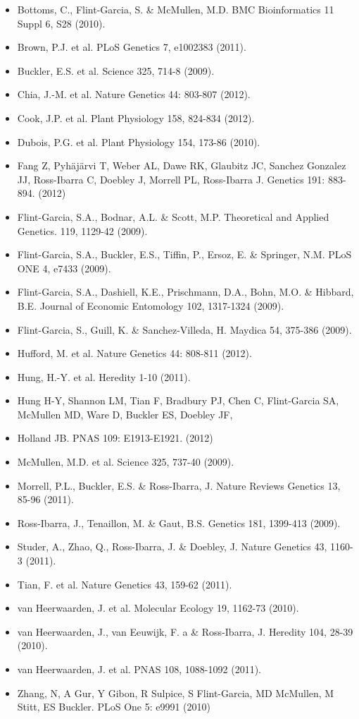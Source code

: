 \begin{itemize}[noitemsep]\item Bottoms, C., Flint-Garcia, S. \& McMullen, M.D.  BMC Bioinformatics 11 Suppl 6, S28 (2010).
\item Brown, P.J. et al.  PLoS Genetics 7, e1002383 (2011).
\item Buckler, E.S. et al. Science 325, 714-8 (2009).
\item Chia, J.-M. et al. Nature Genetics 44: 803-807 (2012).
\item Cook, J.P. et al.  Plant Physiology 158, 824-834 (2012).
\item Dubois, P.G. et al. Plant Physiology 154, 173-86 (2010). 
\item Fang Z, Pyh\"aj\"arvi T, Weber AL, Dawe RK, Glaubitz JC, Sanchez Gonzalez JJ, Ross-Ibarra C, Doebley J, Morrell PL, Ross-Ibarra J. Genetics 191: 883-894. (2012)
\item Flint-Garcia, S.A., Bodnar, A.L. \& Scott, M.P.  Theoretical and Applied Genetics. 119, 1129-42 (2009).
\item Flint-Garcia, S.A., Buckler, E.S., Tiffin, P., Ersoz, E. \& Springer, N.M.  PLoS ONE 4, e7433 (2009).
\item Flint-Garcia, S.A., Dashiell, K.E., Prischmann, D.A., Bohn, M.O. \& Hibbard, B.E. Journal of Economic Entomology 102, 1317-1324 (2009).
\item Flint-Garcia, S., Guill, K. \& Sanchez-Villeda, H. Maydica 54, 375-386 (2009).
\item Hufford, M. et al. Nature Genetics 44: 808-811 (2012).
\item Hung, H.-Y. et al.  Heredity 1-10 (2011).
\item Hung H-Y, Shannon LM, Tian F, Bradbury PJ, Chen C, Flint-Garcia SA, McMullen MD, Ware D, Buckler ES, Doebley JF, \item Holland JB. PNAS 109: E1913-E1921. (2012)
\item McMullen, M.D. et al. Science 325, 737-40 (2009).
\item Morrell, P.L., Buckler, E.S. \& Ross-Ibarra, J. Nature Reviews Genetics 13, 85-96 (2011).
\item Ross-Ibarra, J., Tenaillon, M. \& Gaut, B.S. Genetics 181, 1399-413 (2009).
\item Studer, A., Zhao, Q., Ross-Ibarra, J. \& Doebley, J.  Nature Genetics 43, 1160-3 (2011).
\item Tian, F. et al.  Nature Genetics 43, 159-62 (2011).
\item van Heerwaarden, J. et al. Molecular Ecology 19, 1162-73 (2010).
\item van Heerwaarden, J., van Eeuwijk, F. a \& Ross-Ibarra, J.  Heredity 104, 28-39 (2010).
\item van Heerwaarden, J. et al. PNAS 108, 1088-1092 (2011).
\item Zhang, N, A Gur, Y Gibon, R Sulpice, S Flint-Garcia, MD McMullen, M Stitt, ES Buckler.  PLoS One 5: e9991 (2010)
\end{itemize}
